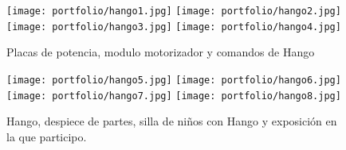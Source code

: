    \begin{figure}
      \begin{center}
         \texttt{[image: portfolio/hango1.jpg]}
         \texttt{[image: portfolio/hango2.jpg]}
         \texttt{[image: portfolio/hango3.jpg]}
         \texttt{[image: portfolio/hango4.jpg]}
      \end{center}
      \caption{Placas de potencia, modulo motorizador y comandos de Hango}
      \label{fig:hango1}
   \end{figure}
   \begin{figure}
      \begin{center}
         \texttt{[image: portfolio/hango5.jpg]}
         \texttt{[image: portfolio/hango6.jpg]}
         \texttt{[image: portfolio/hango7.jpg]}
         \texttt{[image: portfolio/hango8.jpg]}
      \end{center}
      \caption{Hango, despiece de partes, silla de niños con Hango y exposición en la que participo.}
      \label{fig:hango2}
   \end{figure}
